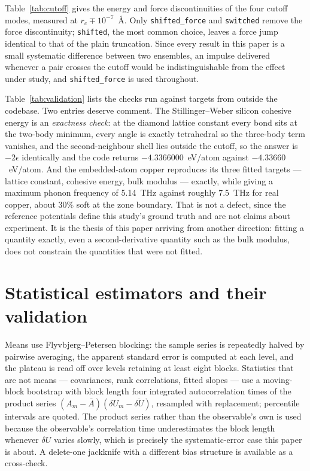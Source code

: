 \documentclass[aip,jcp,reprint,amsmath,amssymb,floatfix]{revtex4-2}
\newcommand{\dU}{\ensuremath{\delta U}}
\begin{document}
Table~\ref{tab:cutoff} gives the energy and force discontinuities of the four
cutoff modes, measured at $r_c \mp 10^{-7}$~\AA. Only \texttt{shifted\_force}
and \texttt{switched} remove the force discontinuity; \texttt{shifted}, the most
common choice, leaves a force jump identical to that of the plain truncation.
Since every result in this paper is a small systematic difference between two
ensembles, an impulse delivered whenever a pair crosses the cutoff would be
indistinguishable from the effect under study, and \texttt{shifted\_force} is
used throughout.

Table~\ref{tab:validation} lists the checks run against targets from outside the
codebase. Two entries deserve comment. The Stillinger--Weber silicon cohesive
energy is an \emph{exactness check}: at the diamond lattice constant every bond
sits at the two-body minimum, every angle is exactly tetrahedral so the
three-body term vanishes, and the second-neighbour shell lies outside the
cutoff, so the answer is $-2\epsilon$ identically and the code returns
$-4.3366000$~eV/atom against $-4.33660$~eV/atom. And the embedded-atom copper
reproduces its three fitted targets --- lattice constant, cohesive energy, bulk
modulus --- exactly, while giving a maximum phonon frequency of 5.14~THz against
roughly 7.5~THz for real copper, about 30\% soft at the zone boundary. That is
not a defect, since the reference potentials define this study's ground truth
and are not claims about experiment. It is the thesis of this paper arriving
from another direction: fitting a quantity exactly, even a second-derivative
quantity such as the bulk modulus, does not constrain the quantities that were
not fitted.

\section{Statistical estimators and their validation}
\label{app:statistics}

Means use Flyvbjerg--Petersen blocking\cite{Flyvbjerg1989}: the sample series is
repeatedly halved by pairwise averaging, the apparent standard error is computed
at each level, and the plateau is read off over levels retaining at least eight
blocks. Statistics that are not means --- covariances, rank correlations, fitted
slopes --- use a moving-block bootstrap\cite{Kunsch1989, PolitisRomano1994} with
block length four integrated autocorrelation times of the product series
$(A_m - \bar A)(\dU_m - \overline{\dU})$, resampled with replacement; percentile
intervals are quoted. The product series rather than the observable's own is
used because the observable's correlation time underestimates the block length
whenever $\dU$ varies slowly, which is precisely the systematic-error case this
paper is about. A delete-one jackknife with a different bias structure is
available as a cross-check.
\end{document}
